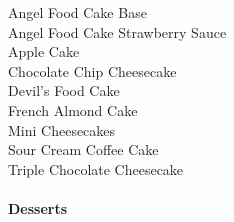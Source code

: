 \documentclass[11pt, twoside, openany]{book}
\begin{document}
Angel Food Cake Base\hrulefill\pageref{angel-food-cake-base}\\
Angel Food Cake Strawberry Sauce\hrulefill\pageref{angel-food-cake-strawberry-sauce}\\
Apple Cake\hrulefill\pageref{apple-cake}\\
Chocolate Chip Cheesecake\hrulefill\pageref{chocolate-chip-cheesecake}\\
Devil's Food Cake\hrulefill\pageref{devil's-food-cake}\\
French Almond Cake\hrulefill\pageref{french-almond-cake}\\
Mini Cheesecakes\hrulefill\pageref{mini-cheesecakes}\\
Sour Cream Coffee Cake\hrulefill\pageref{sour-cream-coffee-cake}\\
Triple Chocolate Cheesecake\hrulefill\pageref{triple-chocolate-cheesecake}\\
{~\vspace{2mm}\\ \Large \textbf{Desserts}}\hfill\textbf{\pageref{desserts}}
\end{document}
